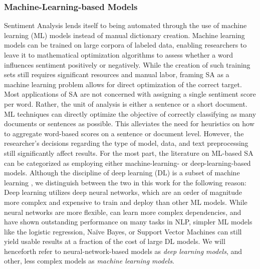\subsubsection{Machine-Learning-based Models}
\label{section-ml-based-sa}
Sentiment Analysis lends itself to being automated through the use of machine learning (ML) models instead of manual dictionary creation. Machine learning models can be trained on large corpora of labeled data, enabling researchers to leave it to mathematical optimization algorithms to assess whether a word influences sentiment positively or negatively. While the creation of such training sets still requires significant resources and manual labor, framing SA as a machine learning problem allows for direct optimization of the correct target. Most applications of SA are not concerned with assigning a single sentiment score per word. Rather, the unit of analysis is either a sentence or a short document. ML techniques can directly optimize the objective of correctly classifying as many documents or sentences as possible. This alleviates the need for heuristics on how to aggregate word-based scores on a sentence or document level. However, the researcher's decisions regarding the type of model, data, and text preprocessing still significantly affect results.\newline
For the most part, the literature on ML-based SA can be categorized as employing either machine-learning- or deep-learning-based models. Although the discipline of deep learning (DL) is a subset of machine learning , we distinguish between the two in this work for the following reason: Deep learning utilizes deep neural networks, which are an order of magnitude more complex and expensive to train and deploy than other ML models. While neural networks are more flexible, can learn more complex dependencies, and have shown outstanding performance on many tasks in NLP, simpler ML models like the logistic regression, Na\"ive Bayes, or Support Vector Machines can still yield usable results at a fraction of the cost of large DL models. We will henceforth refer to neural-network-based models as \emph{deep learning models}, and other, less complex models as \emph{machine learning models}.

